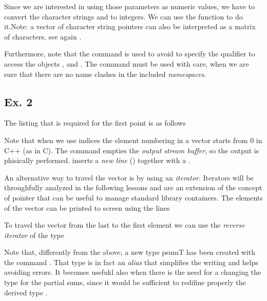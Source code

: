 Since we are interested in using those parameters as numeric values, we have to
convert the character strings  and  to integers. We
can use the function  to do it.Note: a vector of character string
pointers can also be interpreted as a matrix of characters, see again 
.
%
\lstset{basicstyle=\scriptsize\sf}

\lstset{basicstyle=\sf}
%
Furthermore, note that the command  is used to avoid
to specify the qualifier  to access the objects ,
 and . The command  must be used with
care, when we are sure that there are no name clashes in the included 
\emph{namespaces}.

\subsection*{Ex. 2}
The listing that is required for the first point is as follows
%
\lstset{basicstyle=\scriptsize\sf}

\lstset{basicstyle=\sf}

Note that when we use indices the element numbering in a vector  starts
from $0$ in C++ (as in C). The command  empties the
\emph{output stream buffer}, so the output is phisically performed.
 inserts a \emph{new line} () together with a
.

An alternative way to travel the vector is by using an \emph{iterator}.
Iterators will be throughfully analyzed in the following lessons and are an
extension of the concept of pointer that can be useful to manage standard
library containers. The elements of the vector  can be printed to
screen using the lines
\lstset{basicstyle=\scriptsize\sf}

\lstset{basicstyle=\sf}

To travel the vector from the last to the first element we can use the
\emph{reverse iterator} of the  type
\lstset{basicstyle=\scriptsize\sf}

\lstset{basicstyle=\sf}

Note that, differently from the above, a new type psumT has been created with
the command . That type is in fact an \emph{alias} that simplifies
the writing and helps avoiding errors. It becomes usefukl also when there is the
need for a changing the type for the partial sums, since it would be sufficient
to redifine properly the derived type .

